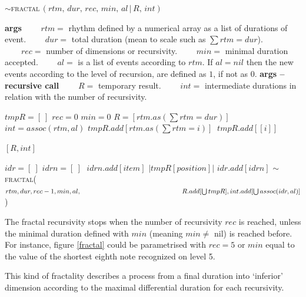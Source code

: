 \begin{algorithm}[h]
\caption{$\sim$\textsc{fractal}$\,(rtm,\, dur,\, rec,\, min,\, al\,|\,R,\, int)$}\label{fra}
\begin{algorithmic}%
\State \textbf{args}
\State $\qquad rtm =$ rhythm defined by a numerical array as a list of durations of  event.
\State $\qquad dur =$ total duration (mean to scale such as $\sum rtm = dur$).
\State $\qquad rec =$ number of dimensions or recursivity.
\State $\qquad min =$ minimal duration accepted.
\State $\qquad al =$ is a list of events according to $rtm$. If $al = nil$ then the new events according to the level of recursion, are defined as $1$, if not as $0$.
\State \textbf{args -- recursive call}
\State $\qquad R =$ temporary result.
\State $\qquad int =$ intermediate durations in relation with the number of recursivity.
\State

\State $tmpR=[\:]$
 $rec=0$
\EndIf
{} $min=0$
\EndIf
{} $R=[rtm.as(\sum rtm=dur)]$
\EndIf
{}
$int = assoc(rtm, al)$
\EndIf
{}
 $tmpR.add[rtm.as(\sum rtm=i)]$
\Else $\: tmpR.add[[i]]$
\EndIf
\EndFor

\State
{}

\Return $[R,int]$
\Else

\State $idr=[\:]$
\State $idrn=[\:]$
\Repeat $\;idrn.add[item]$ 
\Until $| tmpR[position] |$
\State $idr.add[idrn]$
\EndFor
\State $\sim$\textsc{fractal}($rtm, dur, rec-1, min, al, \newline
        \hspace*{15em} R.add[\bigcup tmpR], int.add[\bigcup assoc(idr, al)]$)

\EndIf

\end{algorithmic}
\end{algorithm}

The fractal recursivity stops when the number of recursivity $rec$ is reached, unless the minimal duration defined with $min$ (meaning $min \ne$ nil) is reached before. For instance, figure \ref{fractal} could be parametrised with $rec=5$ or $min$ equal to the value of the shortest eighth note recognized on level 5. 

This kind of fractality describes a process from a final duration into `inferior' dimension according to the maximal differential duration for each recursivity.  

